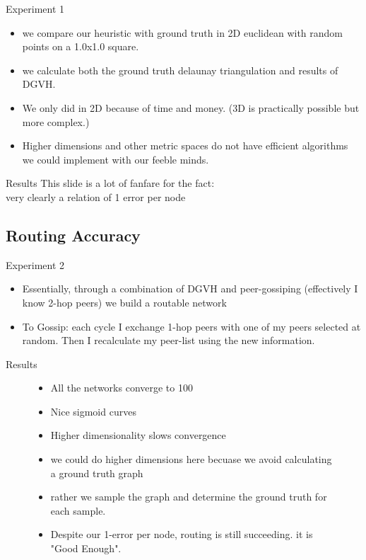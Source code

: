 \documentclass[8pt]{beamer}
\begin{document}
	\begin{frame}{Experiment 1}

		\begin{itemize}
			\item we compare our heuristic with ground truth in 2D euclidean with random points on a 1.0x1.0 square.
			\item we calculate both the ground truth delaunay triangulation and results of DGVH.
			\item We only did in 2D because of time and money. (3D is practically possible but more complex.)
			\item Higher dimensions and other metric spaces do not have efficient algorithms we could implement with our feeble minds.
		\end{itemize}
		
	\end{frame}


\begin{frame}{Results}
	This slide is a lot of fanfare for the fact: \\
	very clearly a relation of 1 error per node 
\end{frame}

\subsection{Routing Accuracy}


\begin{frame}{Experiment 2}


\begin{itemize}
	\item Essentially, through a combination of DGVH and peer-gossiping (effectively I know 2-hop peers) we build a routable network
	\item To Gossip: each cycle I exchange 1-hop peers with one of my peers selected at random. Then I recalculate my peer-list using the new information.
\end{itemize}
\end{frame}



\begin{frame}{Results}
\begin{figure}
		\begin{itemize}
			\item All the networks converge to 100%
			\item Nice sigmoid curves
			\item Higher dimensionality slows convergence
			\item we could do higher dimensions here becuase we avoid calculating a ground truth graph
			\item rather we sample the graph and determine the ground truth for each sample.
			\item Despite our 1-error per node, routing is still succeeding. it is "Good Enough".
		\end{itemize}
 	
 \end{figure}
	


\end{frame}	
\end{document}
